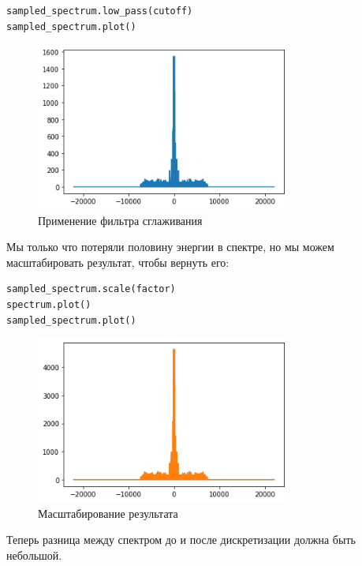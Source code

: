 \documentclass[a4paper,12pt]{report}
\begin{document}
\begin{lstlisting}[caption=Применение фильтра сглаживания]
sampled_spectrum.low_pass(cutoff)
sampled_spectrum.plot()
\end{lstlisting}

\begin{figure}[H]
        \centering
        \includegraphics[width=0.75\textwidth]{lab11_fig3_5.png}
        \caption{Применение фильтра сглаживания}
        \label{fig:lab11_fig3_5}
\end{figure}

Мы только что потеряли половину энергии в спектре, но мы можем масштабировать результат, чтобы вернуть его:

\begin{lstlisting}[caption=Масштабирование результата]
sampled_spectrum.scale(factor)
spectrum.plot()
sampled_spectrum.plot()
\end{lstlisting}

\begin{figure}[H]
        \centering
        \includegraphics[width=0.75\textwidth]{lab11_fig3_6.png}
        \caption{Масштабирование результата}
        \label{fig:lab11_fig3_6}
\end{figure}

Теперь разница между спектром до и после дискретизации должна быть небольшой.
\end{document}
